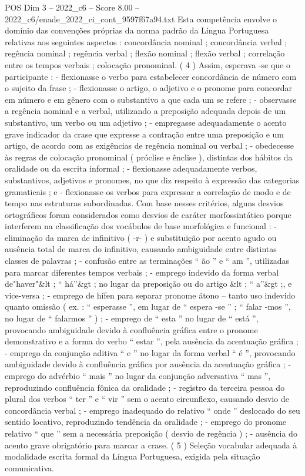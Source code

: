 \begin{textsample}{POS Dim 3 – 2022\_c6 – Score 8.00 – 2022\_c6/enade\_2022\_ci\_cont\_9597f67a94.txt}
Esta competência envolve o domínio das convenções próprias da norma padrão da Língua Portuguesa relativas aos seguintes aspectos : concordância nominal ; concordância verbal ; regência nominal ; regência verbal ; flexão nominal ; flexão verbal ; correlação entre os tempos verbais ; colocação pronominal. ( 4 ) Assim, esperava -se que o participante : - flexionasse o verbo para estabelecer concordância de número com o sujeito da frase ; - flexionasse o artigo, o adjetivo e o pronome para concordar em número e em gênero com o substantivo a que cada um se refere ; - observasse a regência nominal e a verbal, utilizando a preposição adequada depois de um substantivo, um verbo ou um adjetivo ; - empregasse adequadamente o acento grave indicador da crase que expresse a contração entre uma preposição e um artigo, de acordo com as exigências de regência nominal ou verbal ; - obedecesse às regras de colocação pronominal ( próclise e ênclise ), distintas dos hábitos da oralidade ou da escrita informal ; - flexionasse adequadamente verbos, substantivos, adjetivos e pronomes, no que diz respeito à expressão das categorias gramaticais ; e - flexionasse os verbos para expressar a correlação de modo e de tempo nas estruturas subordinadas.
Com base nesses critérios, alguns desvios ortográficos foram considerados como desvios de caráter morfossintático porque interferem na classificação dos vocábulos de base morfológica e funcional : - eliminação da marca de infinitivo ( -r- ) e substituição por acento agudo ou ausência total de marca do infinitivo, causando ambiguidade entre distintas classes de palavras ; - confusão entre as terminações “ ão ” e “ am ”, utilizadas para marcar diferentes tempos verbais ; - emprego indevido da forma verbal de"haver"\&lt ; “ há”\&gt ; no lugar da preposição ou do artigo \&lt ; “ a”\&gt ;, e vice-versa ; - emprego de hífen para separar pronome átono – tanto uso indevido quanto omissão ( ex. : “ esperasse ”, em lugar de “ espera -se ” ; “ falar -mos ”, no lugar de “ falarmos ” ) ; - emprego de “ esta ” no lugar de “ está ”, provocando ambiguidade devido à confluência gráfica entre o pronome demonstrativo e a forma do verbo “ estar ”, pela ausência da acentuação gráfica ; - emprego da conjunção aditiva “ e ” no lugar da forma verbal “ é ”, provocando ambiguidade devido à confluência gráfica por ausência da acentuação gráfica ; - emprego do advérbio “ mais ” no lugar da conjunção adversativa “ mas ”, reproduzindo confluência fônica da oralidade ; - registro da terceira pessoa do plural dos verbos “ ter ” e “ vir ” sem o acento circunflexo, causando desvio de concordância verbal ; - emprego inadequado do relativo “ onde ” deslocado do seu sentido locativo, reproduzindo tendência da oralidade ; - emprego do pronome relativo “ que ” sem a necessária preposição ( desvio de regência ) ; - ausência do acento grave obrigatório para marcar a crase. ( 5 ) Seleção vocabular adequada à modalidade escrita formal da Língua Portuguesa, exigida pela situação comunicativa.

\end{textsample}
